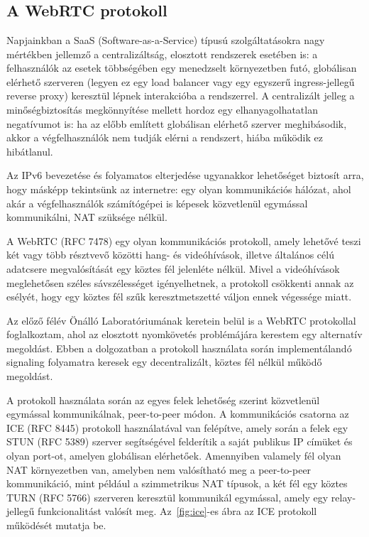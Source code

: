 \chapter{\bevezetes}\label{ch:bevezetes}


\section{A WebRTC protokoll}\label{sec:a-webrtc-protokoll}

Napjainkban a SaaS (Software-as-a-Service) típusú szolgáltatásokra nagy mértékben jellemző a centralizáltság, elosztott
rendszerek esetében is: a felhasználók az esetek többségében egy menedzselt környezetben futó, globálisan
elérhető szerveren (legyen ez egy load balancer vagy egy egyszerű ingress-jellegű reverse proxy) keresztül lépnek
interakcióba a rendszerrel.
A centralizált jelleg a minőségbiztosítás megkönnyítése mellett hordoz egy elhanyagolhatatlan negatívumot is: ha az előbb
említett globálisan elérhető szerver meghibásodik, akkor a végfelhasználók nem tudják elérni a rendszert, hiába működik
ez hibátlanul.

Az IPv6 bevezetése és folyamatos elterjedése ugyanakkor lehetőséget biztosít arra, hogy másképp tekintsünk az internetre:
egy olyan kommunikációs hálózat, ahol akár a végfelhasználók számítógépei is képesek közvetlenül egymással kommunikálni,
NAT szüksége nélkül.

A WebRTC (RFC 7478\cite{RFC_7478}) egy olyan kommunikációs protokoll, amely lehetővé teszi két vagy több résztvevő közötti hang- és
videóhívások, illetve általános célú adatcsere megvalósítását egy köztes fél jelenléte nélkül.
Mivel a videóhívások meglehetősen széles sávszélességet igényelhetnek, a protokoll csökkenti annak az esélyét,
hogy egy köztes fél szűk keresztmetszetté váljon ennek végessége miatt.

Az előző félév Önálló Laboratóriumának keretein belül is a WebRTC protokollal foglalkoztam, ahol az elosztott nyomkövetés
problémájára kerestem egy alternatív megoldást.
Ebben a dolgozatban a protokoll használata során implementálandó signaling folyamatra keresek egy decentralizált, köztes
fél nélkül működő megoldást.

A protokoll használata során az egyes felek lehetőség szerint közvetlenül egymással kommunikálnak, peer-to-peer módon.
A kommunikációs csatorna az ICE (RFC 8445\cite{ICE}) protokoll használatával van felépítve, amely során a felek egy STUN (RFC 5389)
szerver segítségével felderítik a saját publikus IP címüket és olyan port-ot, amelyen globálisan elérhetőek.
Amennyiben valamely fél olyan NAT környezetben van, amelyben nem valósítható meg a peer-to-peer kommunikáció, mint például
a szimmetrikus NAT típusok, a két fél egy köztes TURN (RFC 5766\cite{TURN}) szerveren keresztül kommunikál egymással, amely egy
relay-jellegű funkcionalitást valósít meg.
Az~\ref{fig:ice}-es ábra az ICE protokoll működését mutatja be.

